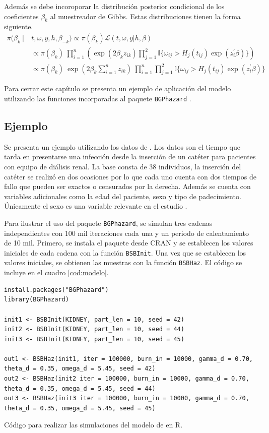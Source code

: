 \documentclass[11pt,a4paper]{article}
\begin{document}
Además se debe incoroporar la distribución posterior condicional de los coeficientes $\beta_k$ al muestreador de Gibbs. Estas distribuciones tienen la forma siguiente.
\begin{align*}
\pi(\beta_k \ | \ &t, \omega, y, h, \beta_{-k}) \propto \pi(\beta_k) \mathcal{L}(t, \omega, y | h, \beta)\\
&\propto \pi(\beta_k) \ \prod_{i=1}^n \left( \exp (2\beta_k z_{ik}) \prod_{j=1}^2 \mathbb{I}\lbrace \omega_{ij} > H_j(t_{ij})\exp (z_i^\prime \beta) \rbrace \right)\\
&\propto \pi(\beta_k) \ \exp\left( 2\beta_k \sum_{i=1}^n z_{ik}\right) \ \prod_{i=1}^n\prod_{j=1}^2 \mathbb{I}\lbrace \omega_{ij} > H_j(t_{ij})\exp (z_i^\prime \beta) \rbrace
\end{align*}

Para cerrar este capítulo se presenta un ejemplo de aplicación del modelo utilizando las funciones incorporadas al paquete \texttt{BGPhazard} \citep{bgphazard}.

\subsection{Ejemplo}
\label{sec:ejemplo}
Se presenta un ejemplo utilizando los datos de \citet{kidney}. Los datos son el tiempo que tarda en presentarse una infección desde la inserción de un catéter para pacientes con equipo de diálisis renal. La base consta de 38 individuos, la inserción del catéter se realizó en dos ocasiones por lo que cada uno cuenta con dos tiempos de fallo que pueden ser exactos o censurados por la derecha. Además se cuenta con variables adicionales como la edad del paciente, sexo y tipo de padecimiento. Únicamente el sexo es una variable relevante en el estudio \citep{nieto}.

Para ilustrar el uso del paquete \texttt{BGPhazard}, se simulan tres cadenas independientes con 100 mil iteraciones cada una y un periodo de calentamiento de 10 mil. Primero, se instala el paquete desde CRAN y se establecen los valores iniciales de cada cadena con la función \texttt{BSBInit}. Una vez que se establecen los valores iniciales, se obtienen las muestras con la función \texttt{BSBHaz}. El código se incluye en el cuadro \ref{cod:modelo}.

\begin{table}[!htb]
\begin{lstlisting}
install.packages("BGPhazard")
library(BGPhazard)

init1 <- BSBInit(KIDNEY, part_len = 10, seed = 42)
init2 <- BSBInit(KIDNEY, part_len = 10, seed = 44)
init3 <- BSBInit(KIDNEY, part_len = 10, seed = 45)

out1 <- BSBHaz(init1, iter = 100000, burn_in = 10000, gamma_d = 0.70, theta_d = 0.35, omega_d = 5.45, seed = 42)
out2 <- BSBHaz(init2 iter = 100000, burn_in = 10000, gamma_d = 0.70, theta_d = 0.35, omega_d = 5.45, seed = 44)
out3 <- BSBHaz(init3 iter = 100000, burn_in = 10000, gamma_d = 0.70, theta_d = 0.35, omega_d = 5.45, seed = 45)
\end{lstlisting}
\caption{Código para realizar las simulaciones del modelo de \citet{nieto} en R.}
\label{cod:modelo}
\end{table}
\end{document}
